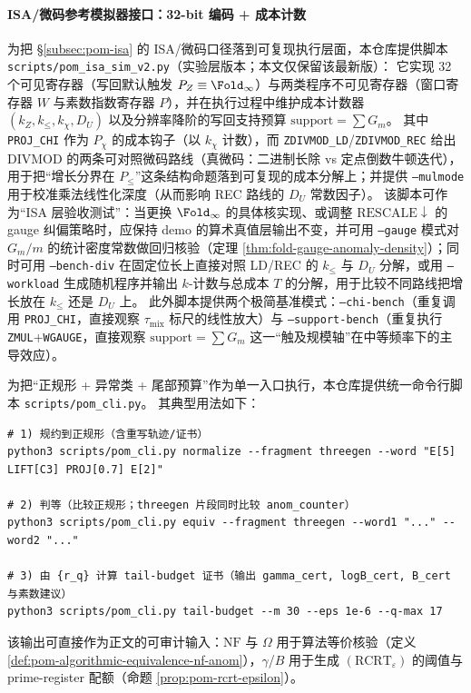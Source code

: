 \paragraph{ISA/微码参考模拟器接口：32-bit 编码 + 成本计数}
为把 \S\ref{subsec:pom-isa} 的 ISA/微码口径落到可复现执行层面，本仓库提供脚本
\texttt{scripts/pom\_isa\_sim\_v2.py}（实验层版本；本文仅保留该最新版）：
它实现 32 个可见寄存器（写回默认触发 \(P_Z\equiv\Fold_\infty\)）与两类程序不可见寄存器（窗口寄存器 \(W\) 与素数指数寄存器 \(P\)），并在执行过程中维护成本计数器
\((k_Z,k_{\le},k_\chi,D_U)\)
以及分辨率降阶的写回支持预算
\(\mathrm{support}=\sum G_m\)。
其中 \texttt{PROJ\_CHI} 作为 \(P_\chi\) 的成本钩子（以 \(k_\chi\) 计数），而 \texttt{ZDIVMOD\_LD}/\texttt{ZDIVMOD\_REC} 给出 DIVMOD 的两条可对照微码路线（真微码：二进制长除 vs 定点倒数牛顿迭代），用于把“增长分界在 \(P_{\le}\)”这条结构命题落到可复现的成本分解上；并提供 \texttt{--mulmode} 用于校准乘法线性化深度（从而影响 REC 路线的 \(D_U\) 常数因子）。
该脚本可作为“ISA 层验收测试”：当更换 \(\Fold_\infty\) 的具体核实现、或调整 \(\mathrm{RESCALE}\downarrow\) 的 gauge 纠偏策略时，应保持 demo 的算术真值层输出不变，并可用 \texttt{--gauge} 模式对 \(G_m/m\) 的统计密度常数做回归核验（定理 \ref{thm:fold-gauge-anomaly-density}）；同时可用 \texttt{--bench-div} 在固定位长上直接对照 LD/REC 的 \(k_{\le}\) 与 \(D_U\) 分解，或用 \texttt{--workload} 生成随机程序并输出 \(k\)-计数与总成本 \(T\) 的分解，用于比较不同路线把增长放在 \(k_{\le}\) 还是 \(D_U\) 上。
此外脚本提供两个极简基准模式：\texttt{--chi-bench}（重复调用 \texttt{PROJ\_CHI}，直接观察 \(\tau_{\mathrm{mix}}\) 标尺的线性放大）与 \texttt{--support-bench}（重复执行 \texttt{ZMUL}+\texttt{WGAUGE}，直接观察 \(\mathrm{support}=\sum G_m\) 这一“触及规模轴”在中等频率下的主导效应）。

\begin{remark}\label{rem:pom-cli-one-shot}
为把“正规形 + 异常类 + 尾部预算”作为单一入口执行，本仓库提供统一命令行脚本 \texttt{scripts/pom\_cli.py}。
其典型用法如下：
\begin{verbatim}
# 1) 规约到正规形（含重写轨迹/证书）
python3 scripts/pom_cli.py normalize --fragment threegen --word "E[5] LIFT[C3] PROJ[0.7] E[2]"

# 2) 判等（比较正规形；threegen 片段同时比较 anom_counter）
python3 scripts/pom_cli.py equiv --fragment threegen --word1 "..." --word2 "..."

# 3) 由 {r_q} 计算 tail-budget 证书（输出 gamma_cert, logB_cert, B_cert 与素数建议）
python3 scripts/pom_cli.py tail-budget --m 30 --eps 1e-6 --q-max 17
\end{verbatim}
该输出可直接作为正文的可审计输入：\(\mathrm{NF}\) 与 \(\Omega\) 用于算法等价核验（定义 \ref{def:pom-algorithmic-equivalence-nf-anom}），\(\gamma\)/\(B\) 用于生成 \((\mathrm{RCRT}_\varepsilon)\) 的阈值与 prime-register 配额（命题 \ref{prop:pom-rcrt-epsilon}）。
\end{remark}

